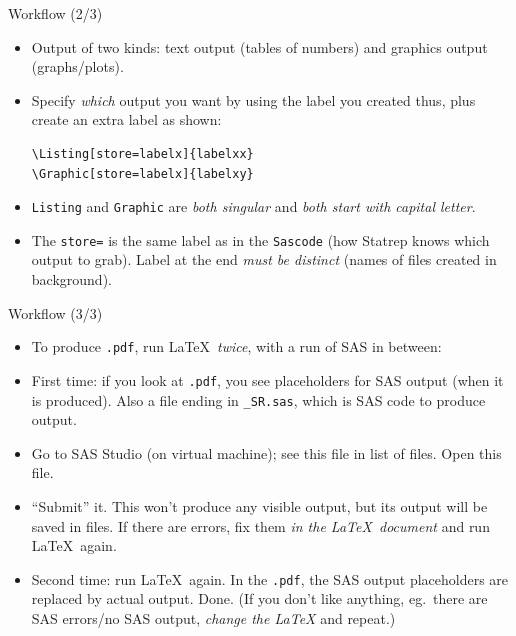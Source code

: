 \documentclass[unknownkeysallowed]{beamer}\usepackage[]{graphicx}\usepackage[]{color}
\begin{document}
\begin{frame}[fragile]{Workflow (2/3)}
  
  \begin{itemize}
  \item Output of two kinds: text output (tables of numbers) and
    graphics output (graphs/plots).
  \item Specify \emph{which} output you want by using the label you
    created thus, plus create an extra label as shown:
    
\begin{verbatim}
\Listing[store=labelx]{labelxx}
\Graphic[store=labelx]{labelxy}
\end{verbatim}
  \item \texttt{Listing} and \texttt{Graphic} are \emph{both singular}
    and \emph{both start with capital letter}.
    
    
  \item The \texttt{store=} is the same label as in the
    \texttt{Sascode} (how Statrep knows which output to grab). Label
    at the end \emph{must be distinct} (names of files created in
    background). 
  \end{itemize}
  
\end{frame}

\begin{frame}[fragile]{Workflow (3/3)}
  
  \begin{itemize}
  \item To produce \texttt{.pdf}, run \LaTeX\ \emph{twice}, with a run
    of SAS in between:
  \item First time: if you look at \texttt{.pdf}, you see placeholders
    for SAS output (when it is produced). Also a file ending in
    \texttt{\_SR.sas}, which is SAS code to produce output.
  \item Go to SAS Studio (on virtual machine); see this file in list
    of files. Open this file.
  \item ``Submit'' it. This won't produce any visible output, but its
    output will be saved in files. If there are errors, fix them
    \emph{in the \LaTeX\ document} and run \LaTeX\ again.
  \item Second time: run \LaTeX\ again. In the \texttt{.pdf}, the SAS
    output placeholders are replaced by actual output. Done. (If you
    don't like anything, eg.\ there are SAS errors/no SAS output,
    \emph{change the \LaTeX} and repeat.)
  \end{itemize}
  
\end{frame}
\end{document}
